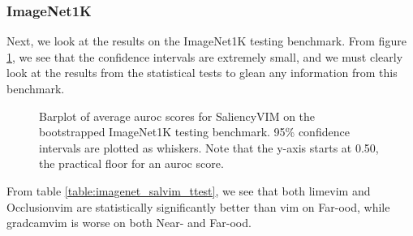 \documentclass[UKenglish]{uiomasterthesis} %
\theoremstyle{definition}
\begin{document}
\subsubsection{ImageNet1K}

Next, we look at the results on the ImageNet1K testing benchmark. From figure \ref{fig:imagenet_salvim_bootstrap_barplot}, we see that the confidence intervals are extremely small, and we must clearly look at the results from the statistical tests to glean any information from this benchmark.

\begin{figure}[H]
    \begin{center}
        
    \end{center}
    \caption[ImageNet1K SaliencyVIM Bootstrap]{Barplot of average \ac{auroc} scores for SaliencyVIM on the bootstrapped ImageNet1K testing benchmark. 95\% confidence intervals are plotted as whiskers. Note that the y-axis starts at 0.50, the practical floor for an \ac{auroc} score.}
    \label{fig:imagenet_salvim_bootstrap_barplot}
\end{figure}

From table \ref{table:imagenet_salvim_ttest}, we see that both \ac{lime}\ac{vim} and Occlusion\ac{vim} are statistically significantly better than \ac{vim} on Far-\ac{ood}, while \ac{gradcam}\ac{vim} is worse on both Near- and Far-\ac{ood}.
\end{document}
